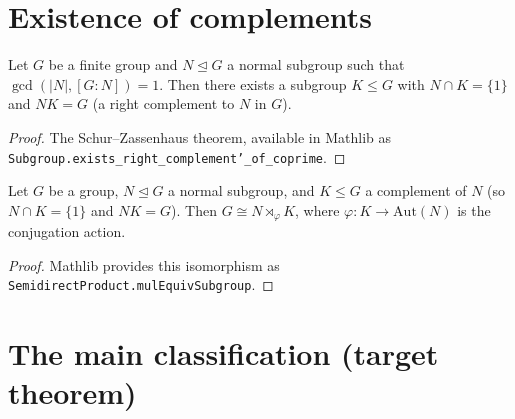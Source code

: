 \section{Existence of complements}

\begin{lemma}
    \label{lem:schur-zassenhaus}
    Let $G$ be a finite group and $N \trianglelefteq G$ a normal subgroup
    such that $\gcd(|N|, [G : N]) = 1$. Then there exists a subgroup
    $K \leq G$ with $N \cap K = \{1\}$ and $N K = G$ (a right complement to
    $N$ in $G$).
\end{lemma}
\begin{proof}
    The Schur--Zassenhaus theorem, available in Mathlib as
    \texttt{Subgroup.exists\_right\_complement'\_of\_coprime}.
\end{proof}

\begin{lemma}
    \label{lem:sdp-from-complement}
    Let $G$ be a group, $N \trianglelefteq G$ a normal subgroup, and
    $K \leq G$ a complement of $N$ (so $N \cap K = \{1\}$ and $NK = G$).
    Then $G \cong N \rtimes_\varphi K$, where
    $\varphi : K \to \mathrm{Aut}(N)$ is the conjugation action.
\end{lemma}
\begin{proof}
    Mathlib provides this isomorphism as
    \texttt{SemidirectProduct.mulEquivSubgroup}.
\end{proof}

\section{The main classification (target theorem)}

